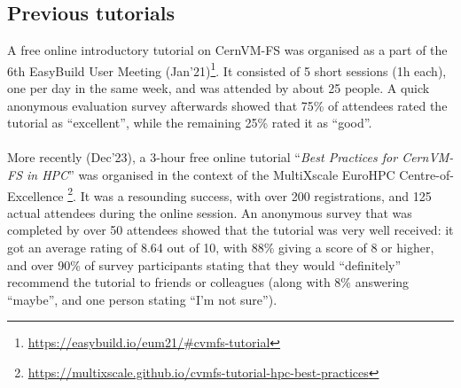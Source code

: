 \subsection*{Previous tutorials}

A free online introductory tutorial on CernVM-FS was organised as a part of the 6th EasyBuild User Meeting
(Jan'21)\footnote{\href{https://easybuild.io/eum21/\#cvmfs-tutorial}{https://easybuild.io/eum21/\#cvmfs-tutorial}}.
It consisted of 5 short sessions (1h each), one per day in the same week, and was attended by about 25 people.
A quick anonymous evaluation survey afterwards showed that 75\% of attendees rated the tutorial as ``excellent'',
while the remaining 25\% rated it as ``good''.

\paragraph{}
More recently (Dec'23), a 3-hour free online tutorial ``\emph{Best Practices for CernVM-FS in HPC}''
was organised in the context of the MultiXscale EuroHPC Centre-of-Excellence
\footnote{\href{https://multixscale.github.io/cvmfs-tutorial-hpc-best-practices}{https://multixscale.github.io/cvmfs-tutorial-hpc-best-practices}}.
It was a resounding success, with over 200 registrations, and 125 actual attendees during the online session.
An anonymous survey that was completed by over 50 attendees showed that the tutorial was very well received:
it got an average rating of 8.64 out of 10, with 88\% giving a score of 8 or higher, and over 90\% of survey
participants stating that they would ``definitely'' recommend the tutorial to friends or colleagues (along with 8\%
answering ``maybe'', and one person stating ``I'm not sure'').
